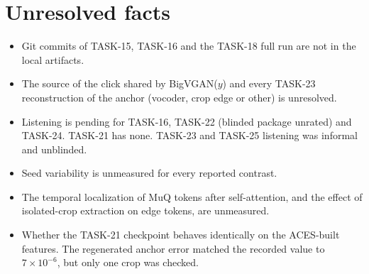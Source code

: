 \documentclass[10pt,letterpaper]{article}
\begin{document}
\section{Unresolved facts}
\begin{itemize}
\item Git commits of TASK-15, TASK-16 and the TASK-18 full run are not in the local artifacts.
\item The source of the click shared by BigVGAN($y$) and every TASK-23 reconstruction of the anchor (vocoder, crop edge or other) is unresolved.
\item Listening is pending for TASK-16, TASK-22 (blinded package unrated) and TASK-24. TASK-21 has none. TASK-23 and TASK-25 listening was informal and unblinded.
\item Seed variability is unmeasured for every reported contrast.
\item The temporal localization of MuQ tokens after self-attention, and the effect of isolated-crop extraction on edge tokens, are unmeasured.
\item Whether the TASK-21 checkpoint behaves identically on the ACES-built features. The regenerated anchor error matched the recorded value to $7\times10^{-6}$, but only one crop was checked.
\end{itemize}



\end{document}
